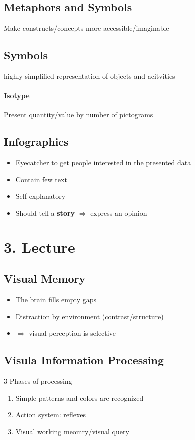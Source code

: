 \documentclass[ngerman]{scrartcl}
\begin{document}
\subsection{Metaphors and Symbols}
Make constructs/concepts more accessible/imaginable

\subsection{Symbols}
highly simplified representation of objects and acitvities

\paragraph{Isotype} Present quantity/value by number of pictograms

\subsection{Infographics}
\begin{itemize}
  \item Eyecatcher to get people interested in the presented data
  \item Contain few text
  \item Self-explanatory
  \item Should tell a \textbf{story} $ \Rightarrow $ express an opinion
\end{itemize}

\section{3. Lecture}
\subsection{Visual Memory}
\begin{itemize}
  \item The brain fills empty gaps
  \item Distraction by environment (contrast/structure)
  \item $ \Rightarrow $ visual perception is selective
\end{itemize}
\subsection{Visula Information Processing}
3 Phases of processing
\begin{enumerate}
  \item Simple patterns and colors are recognized
  \item Action system: reflexes
  \item Visual working meomry/visual query
\end{enumerate}
\end{document}
